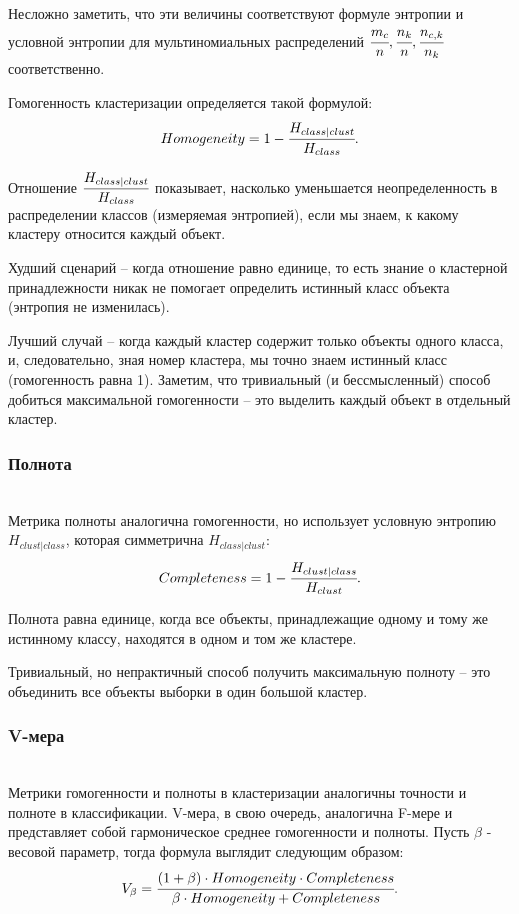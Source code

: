 Несложно заметить, что эти величины соответствуют формуле энтропии и условной энтропии для мультиномиальных распределений $\cfrac{m_c}{n}, \cfrac{n_k}{n}, \cfrac{n_{c,k}}{n_k}$ соответственно.

Гомогенность кластеризации определяется такой формулой:
\begin{equation*}
    Homogeneity = 1 - \cfrac{H_{class \vert clust}}{H_{class}}.
\end{equation*}

Отношение $\cfrac{H_{class \vert clust}}{H_{class}}$ показывает, насколько уменьшается неопределенность в распределении классов (измеряемая энтропией), если мы знаем, к какому кластеру относится каждый объект. 

Худший сценарий -- когда отношение равно единице, то есть знание о кластерной принадлежности никак не помогает определить истинный класс объекта (энтропия не изменилась). 

Лучший случай -- когда каждый кластер содержит только объекты одного класса, и, следовательно, зная номер кластера, мы точно знаем истинный класс (гомогенность равна 1). Заметим, что тривиальный (и бессмысленный) способ добиться максимальной гомогенности -- это выделить каждый объект в отдельный кластер.

\subsubsection{Полнота} \hfill\\

Метрика полноты аналогична гомогенности, но использует условную энтропию $H_{clust \vert class}$, которая симметрична $H_{class \vert clust}$:
\begin{equation*}
    Completeness = 1 - \cfrac{H_{clust \vert class}}{H_{clust}}.
\end{equation*}

Полнота равна единице, когда все объекты, принадлежащие одному и тому же истинному классу, находятся в одном и том же кластере.

Тривиальный, но непрактичный способ получить максимальную полноту -- это объединить все объекты выборки в один большой кластер.

\subsubsection{V-мера} \hfill\\

Метрики гомогенности и полноты в кластеризации аналогичны точности и полноте в классификации.  V-мера, в свою очередь, аналогична F-мере и представляет собой гармоническое среднее гомогенности и полноты. Пусть $\beta$ - весовой параметр, тогда формула выглядит следующим образом:
\begin{equation*}
    V_\beta = \cfrac{(1+\beta) \cdot Homogeneity \cdot Completeness}{\beta \cdot Homogeneity + Completeness}.
\end{equation*}

